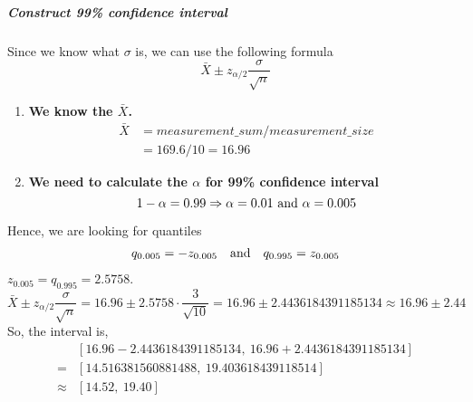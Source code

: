 \subparagraph{Construct 99\% confidence interval}

Since we know what $\sigma$ is, we can use the following formula
\begin{equation*}
  \bar{X} \pm z_{\alpha/2} \frac{\sigma}{\sqrt{n}}
\end{equation*}

\begin{enumerate}[leftmargin=.6cm]
  \item 
\textbf{We know the $\bar{X}$.}
\begin{align*}
  \bar{X} &= measurement\_sum / measurement\_size\\
          &= 169.6 / 10 = 16.96
\end{align*}

\item  
\textbf{We need to calculate the $\alpha$ for 99\% confidence interval}
\begin{equation*}
  1 - \alpha = 0.99 \Rightarrow \alpha = 0.01 \textnormal{ and } \alpha = 0.005
\end{equation*}
\end{enumerate}

\noindent Hence, we are looking for quantiles
\begin{align*}
  &q_{0.005} = -z_{0.005} &\textnormal{and}& &q_{0.995} = z_{0.005}
\end{align*}
$z_{0.005} = q_{0.995} = 2.5758$.
\begin{equation*}
  \bar{X} \pm z_{\alpha/2} \frac{\sigma}{\sqrt{n}} = 16.96 \pm 2.5758 \cdot \frac{3}{\sqrt{10}} = 16.96 \pm 2.4436184391185134 \approx 16.96 \pm 2.44
\end{equation*}
So, the interval is,
\begin{align*}
  &\left[ 16.96 - 2.4436184391185134,\ 16.96 + 2.4436184391185134 \right]\\
  =&\left[ 14.516381560881488,\ 19.403618439118514 \right]\\
  \approx&\left[ 14.52,\ 19.40 \right]
\end{align*}
